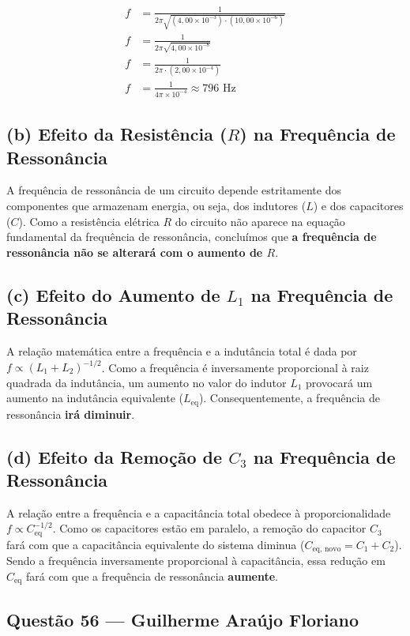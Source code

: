\documentclass[12pt,a4paper]{article}
\begin{document}
\begin{align*}
f &= \frac{1}{2\pi\sqrt{(4,00 \times 10^{-3}) \cdot (10,00 \times 10^{-6})}} \\
f &= \frac{1}{2\pi\sqrt{4,00 \times 10^{-8}}} \\
f &= \frac{1}{2\pi \cdot (2,00 \times 10^{-4})} \\
f &= \frac{1}{4\pi \times 10^{-4}} \approx 796\text{ Hz}
\end{align*}

\subsection*{(b) Efeito da Resistência ($R$) na Frequência de Ressonância}

A frequência de ressonância de um circuito depende estritamente dos componentes que armazenam energia, ou seja, dos indutores ($L$) e dos capacitores ($C$). Como a resistência elétrica $R$ do circuito não aparece na equação fundamental da frequência de ressonância, concluímos que \textbf{a frequência de ressonância não se alterará com o aumento de $R$}.

\subsection*{(c) Efeito do Aumento de $L_1$ na Frequência de Ressonância}

A relação matemática entre a frequência e a indutância total é dada por $f \propto (L_1 + L_2)^{-1/2}$. Como a frequência é inversamente proporcional à raiz quadrada da indutância, um aumento no valor do indutor $L_1$ provocará um aumento na indutância equivalente ($L_{\text{eq}}$). Consequentemente, a frequência de ressonância \textbf{irá diminuir}.

\subsection*{(d) Efeito da Remoção de $C_3$ na Frequência de Ressonância}

A relação entre a frequência e a capacitância total obedece à proporcionalidade $f \propto C_{\text{eq}}^{-1/2}$. Como os capacitores estão em paralelo, a remoção do capacitor $C_3$ fará com que a capacitância equivalente do sistema diminua ($C_{\text{eq, novo}} = C_1 + C_2$). Sendo a frequência inversamente proporcional à capacitância, essa redução em $C_{\text{eq}}$ fará com que a frequência de ressonância \textbf{aumente}.

\subsection{Questão 56 — Guilherme Araújo Floriano}
\end{document}
